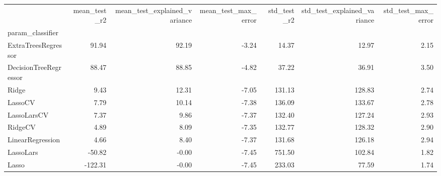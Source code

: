 \begin{tabular}{lrrrrrr}
\toprule
{} &  mean\_test\_r2 &  mean\_test\_explained\_variance &  mean\_test\_max\_error &  std\_test\_r2 &  std\_test\_explained\_variance &  std\_test\_max\_error \\
param\_classifier      &               &                               &                      &              &                              &                     \\
\midrule
ExtraTreesRegressor   &         91.94 &                         92.19 &                -3.24 &        14.37 &                        12.97 &                2.15 \\
DecisionTreeRegressor &         88.47 &                         88.85 &                -4.82 &        37.22 &                        36.91 &                3.50 \\
Ridge                 &          9.43 &                         12.31 &                -7.05 &       131.13 &                       128.83 &                2.74 \\
LassoCV               &          7.79 &                         10.14 &                -7.38 &       136.09 &                       133.67 &                2.78 \\
LassoLarsCV           &          7.37 &                          9.86 &                -7.37 &       132.40 &                       127.24 &                2.93 \\
RidgeCV               &          4.89 &                          8.09 &                -7.35 &       132.77 &                       128.32 &                2.90 \\
LinearRegression      &          4.66 &                          8.40 &                -7.37 &       131.68 &                       126.18 &                2.94 \\
LassoLars             &        -50.82 &                         -0.00 &                -7.45 &       751.50 &                       102.84 &                1.82 \\
Lasso                 &       -122.31 &                         -0.00 &                -7.45 &       233.03 &                        77.59 &                1.74 \\
\bottomrule
\end{tabular}
